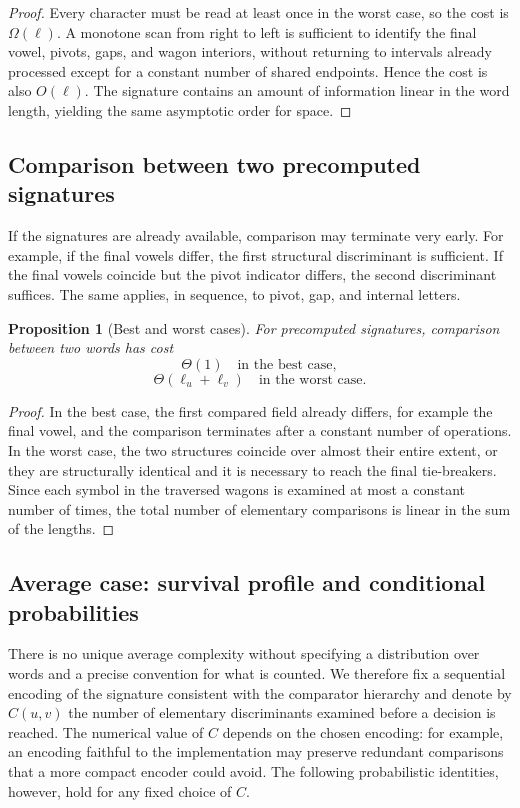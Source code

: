 \documentclass[11pt,a4paper]{article}
\newtheorem{proposition}[theorem]{Proposition}
\theoremstyle{definition}
\theoremstyle{remark}
\begin{document}
\begin{proof}
Every character must be read at least once in the worst case, so the cost is $\Omega(\ell)$. A monotone scan from right to left is sufficient to identify the final vowel, pivots, gaps, and wagon interiors, without returning to intervals already processed except for a constant number of shared endpoints. Hence the cost is also $O(\ell)$. The signature contains an amount of information linear in the word length, yielding the same asymptotic order for space.
\end{proof}

\subsection{Comparison between two precomputed signatures}

If the signatures are already available, comparison may terminate very early. For example, if the final vowels differ, the first structural discriminant is sufficient. If the final vowels coincide but the pivot indicator differs, the second discriminant suffices. The same applies, in sequence, to pivot, gap, and internal letters.

\begin{proposition}[Best and worst cases]
For precomputed signatures, comparison between two words has cost
\[
  \Theta(1) \quad\text{in the best case},
\]
\[
  \Theta(\ell_u+\ell_v) \quad\text{in the worst case}.
\]
\end{proposition}

\begin{proof}
In the best case, the first compared field already differs, for example the final vowel, and the comparison terminates after a constant number of operations. In the worst case, the two structures coincide over almost their entire extent, or they are structurally identical and it is necessary to reach the final tie-breakers. Since each symbol in the traversed wagons is examined at most a constant number of times, the total number of elementary comparisons is linear in the sum of the lengths.
\end{proof}

\subsection{Average case: survival profile and conditional probabilities}

There is no unique average complexity without specifying a distribution over words and a precise convention for what is counted. We therefore fix a sequential encoding of the signature consistent with the comparator hierarchy and denote by $C(u,v)$ the number of elementary discriminants examined before a decision is reached. The numerical value of $C$ depends on the chosen encoding: for example, an encoding faithful to the implementation may preserve redundant comparisons that a more compact encoder could avoid. The following probabilistic identities, however, hold for any fixed choice of $C$.
\end{document}

